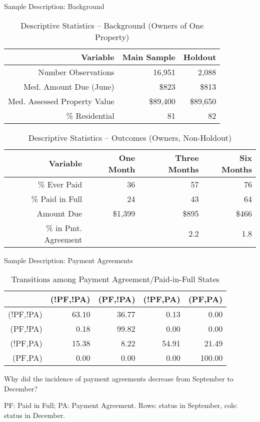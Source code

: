 \documentclass[ignorenonframetext,]{beamer}
\begin{document}
\begin{frame}{Sample Description: Background}

\begin{table}[ht]
\centering
\caption{Descriptive Statistics -- Background (Owners of One Property)} 
\label{table:descriptivesI}
\begin{tabular}{|r|r|r|}
   \hline
Variable & Main Sample & Holdout \\ 
   \hline
Number Observations & 16,951 & 2,088 \\ 
  Med. Amount Due (June) & \$823 & \$813 \\ 
  Med. Assessed Property Value & \$89,400 & \$89,650 \\ 
  \% Residential & 81 & 82 \\ 
   \hline
\end{tabular}
\end{table}\begin{table}[ht]
\centering
\caption{Descriptive Statistics -- Outcomes (Owners, Non-Holdout)} 
\label{table:descriptivesII}
\begin{tabular}{|r|r|r|r|}
  \hline
Variable & One Month & Three Months & Six Months \\ 
  \hline
\% Ever Paid & 36 & 57 & 76 \\ 
  \% Paid in Full & 24 & 43 & 64 \\ 
  Amount Due & \$1,399 & \$895 & \$466 \\ 
  \% in Pmt. Agreement &  & 2.2 & 1.8 \\ 
   \hline
\end{tabular}
\end{table}

\end{frame}

\begin{frame}{Sample Description: Payment Agreements}

\begin{table}[ht]
\centering
\caption{Transitions among Payment Agreement/Paid-in-Full States} 
\label{table:pa_trans}
\begin{tabular}{rrrrr}
  \hline
 & (!PF,!PA) & (PF,!PA) & (!PF,PA) & (PF,PA) \\ 
  \hline
(!PF,!PA) & 63.10 & 36.77 & 0.13 & 0.00 \\ 
  (PF,!PA) & 0.18 & 99.82 & 0.00 & 0.00 \\ 
  (!PF,PA) & 15.38 & 8.22 & 54.91 & 21.49 \\ 
  (PF,PA) & 0.00 & 0.00 & 0.00 & 100.00 \\ 
   \hline
\end{tabular}
\end{table}

Why did the incidence of payment agreements decrease from September to
December?

PF: Paid in Full; PA: Payment Agreement. Rows: status in September,
cols: status in December.

\end{frame}
\end{document}

